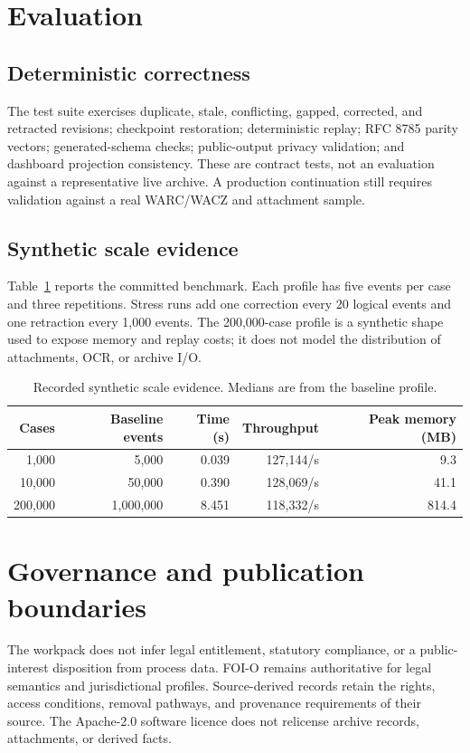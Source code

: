 \documentclass[11pt]{article}
\begin{document}
\section{Evaluation}
\subsection{Deterministic correctness}
The test suite exercises duplicate, stale, conflicting, gapped, corrected, and retracted revisions;
checkpoint restoration; deterministic replay; RFC 8785 parity vectors; generated-schema checks;
public-output privacy validation; and dashboard projection consistency. These are contract tests,
not an evaluation against a representative live archive. A production continuation still requires
validation against a real WARC/WACZ and attachment sample.

\subsection{Synthetic scale evidence}
Table~\ref{tab:scale} reports the committed benchmark. Each profile has five events per case and
three repetitions. Stress runs add one correction every 20 logical events and one retraction every
1,000 events. The 200,000-case profile is a synthetic shape used to expose memory and replay costs;
it does not model the distribution of attachments, OCR, or archive I/O.

\begin{table}[ht]
\centering
\caption{Recorded synthetic scale evidence. Medians are from the baseline profile.}
\label{tab:scale}
\begin{tabular}{rrrrr}
\toprule
Cases & Baseline events & Time (s) & Throughput & Peak memory (MB)\\
\midrule
1,000 & 5,000 & 0.039 & 127,144/s & 9.3\\
10,000 & 50,000 & 0.390 & 128,069/s & 41.1\\
200,000 & 1,000,000 & 8.451 & 118,332/s & 814.4\\
\bottomrule
\end{tabular}
\end{table}

\section{Governance and publication boundaries}
The workpack does not infer legal entitlement, statutory compliance, or a public-interest
disposition from process data. FOI-O remains authoritative for legal semantics and jurisdictional
profiles. Source-derived records retain the rights, access conditions, removal pathways, and
provenance requirements of their source. The Apache-2.0 software licence does not relicense
archive records, attachments, or derived facts.
\end{document}
